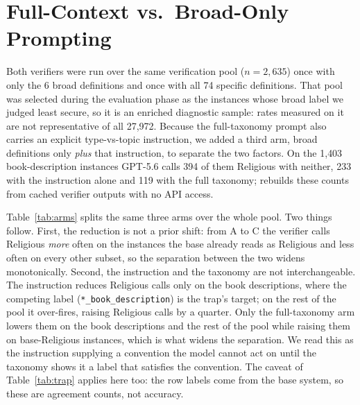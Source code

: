 \documentclass[11pt]{article}
\begin{document}
\section{Full-Context vs.\ Broad-Only Prompting}
\label{app:trap}
Both verifiers were run over the same verification pool ($n=2{,}635$) once with only the
6 broad definitions and once with all 74 specific definitions. That pool was selected during
the evaluation phase as the instances whose broad label we judged least secure, so it is an
enriched diagnostic sample: rates measured on it are not representative of all 27{,}972. Because the full-taxonomy prompt
also carries an explicit type-vs-topic instruction, we added a third arm, broad definitions only
\emph{plus} that instruction, to separate the two factors. On the 1{,}403 book-description
instances GPT-5.6 calls 394 of them Religious with neither, 233 with the instruction alone and
119 with the full taxonomy;  rebuilds these counts from cached
verifier outputs with no API access.

Table~\ref{tab:arms} splits the same three arms over the whole pool. Two things follow. First,
the reduction is not a prior shift: from A to C the verifier calls Religious \emph{more} often on
the instances the base already reads as Religious and less often on every other subset, so the
separation between the two widens monotonically. Second, the instruction and the taxonomy are not
interchangeable. The instruction reduces Religious calls only on the book descriptions, where the competing label
(\texttt{*\_book\_description}) is the trap's target; on the rest of the pool it over-fires,
raising Religious calls by a quarter. Only the full-taxonomy arm lowers them on the book
descriptions and the rest of the pool while raising them on base-Religious instances, which is
what widens the separation. We read
this as the instruction supplying a convention the model cannot act on until the taxonomy shows it
a label that satisfies the convention. The caveat of Table~\ref{tab:trap} applies here too: the
row labels come from the base system, so these are agreement counts, not accuracy.
\end{document}

